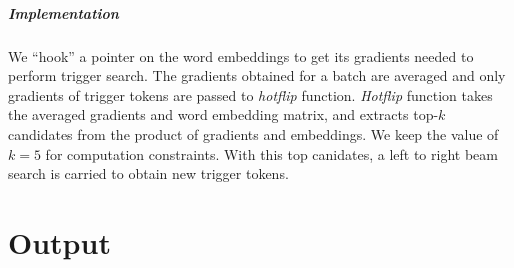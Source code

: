 \documentclass[12pt]{report}
\begin{document}
\begin{spacing}{1.5}
\paragraph{Implementation}
We ``hook'' a pointer on the word embeddings to get its gradients needed to perform trigger search. The gradients obtained for a batch are averaged and only gradients of trigger tokens are passed to \textit{hotflip} function.
\textit{Hotflip} function takes the averaged gradients and word embedding matrix, and extracts top-$k$ candidates from the product of gradients and embeddings. We keep the value of $k = 5$ for computation constraints. With this top canidates, a left to right beam search is carried to obtain new trigger tokens.

\chapter{Output}
\end{spacing}



\end{document}
